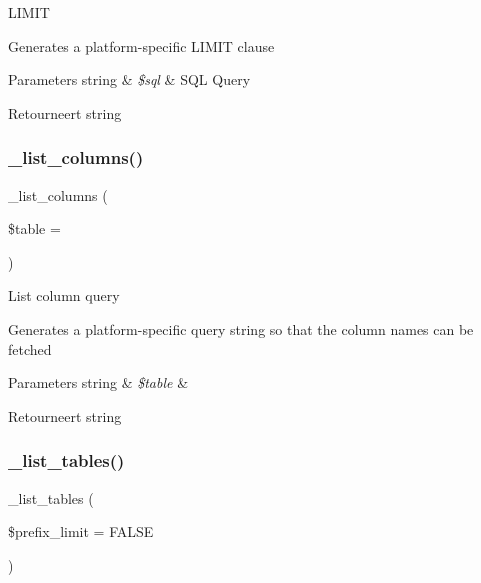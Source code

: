 L\+I\+M\+IT

Generates a platform-\/specific L\+I\+M\+IT clause


\begin{DoxyParams}[1]{Parameters}
string & {\em \$sql} & S\+QL Query \\
\hline
\end{DoxyParams}
\begin{DoxyReturn}{Retourneert}
string 
\end{DoxyReturn}
\mbox{\label{class_c_i___d_b__sqlsrv__driver_a7ccb7f9c301fe7f0a9db701254142b63}} 
\subsubsection{\texorpdfstring{\_list\_columns()}{\_list\_columns()}}
{\footnotesize\ttfamily \+\_\+list\+\_\+columns (\begin{DoxyParamCaption}\item[{}]{\$table = {\ttfamily \textquotesingle{}\textquotesingle{}} }\end{DoxyParamCaption})\hspace{0.3cm}{\ttfamily [protected]}}

List column query

Generates a platform-\/specific query string so that the column names can be fetched


\begin{DoxyParams}[1]{Parameters}
string & {\em \$table} & \\
\hline
\end{DoxyParams}
\begin{DoxyReturn}{Retourneert}
string 
\end{DoxyReturn}
\mbox{\label{class_c_i___d_b__sqlsrv__driver_a435c0f3ce54fe7daa178baa8532ebd54}} 
\subsubsection{\texorpdfstring{\_list\_tables()}{\_list\_tables()}}
{\footnotesize\ttfamily \+\_\+list\+\_\+tables (\begin{DoxyParamCaption}\item[{}]{\$prefix\+\_\+limit = {\ttfamily FALSE} }\end{DoxyParamCaption})\hspace{0.3cm}{\ttfamily [protected]}}

